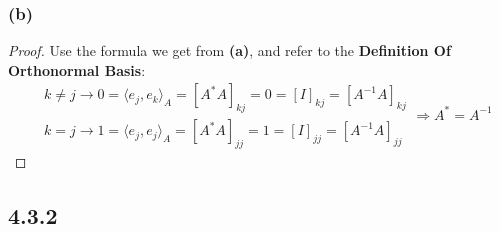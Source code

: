 \documentclass{article}
\newtheorem*{proof}{Proof}
\begin{document}
\subsubsection*{(b)}
\begin{proof}
    Use the formula we get from \textbf{(a)}, and refer to the \textbf{Definition Of Orthonormal Basis}: 
    \begin{equation*}
        \begin{split}
            & k \neq j \rightarrow 0 = \langle e_j, e_k\rangle_A = [A^*A]_{kj} = 0 = [I]_{kj} = [A^{-1}A]_{kj}\\
            & k = j \rightarrow 1 = \langle e_j, e_j\rangle_A = [A^*A]_{jj} = 1 = [I]_{jj} = [A^{-1}A]_{jj}
        \end{split}
        \Rightarrow A^* = A^{-1}
    \end{equation*}
\end{proof}

\subsection*{4.3.2}
\end{document}
